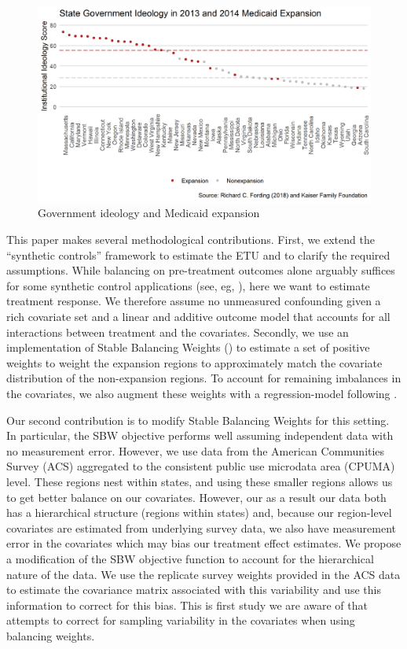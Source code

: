 \documentclass[12pt]{article}
\begin{document}
\begin{figure}
    \begin{center}
    \includegraphics[scale=0.7]{images/political-expansion-plot.png}
    \caption{Government ideology and Medicaid expansion}
    \label{fig1}
    \end{center}
\end{figure}

This paper makes several methodological contributions. First, we extend the ``synthetic controls'' framework to estimate the ETU and to clarify the required assumptions. While balancing on pre-treatment outcomes alone arguably suffices for some synthetic control applications (see, eg, \cite{botosaru2017role}), here we want to estimate treatment response. We therefore assume no unmeasured confounding given a rich covariate set and a linear and additive outcome model that accounts for all interactions between treatment and the covariates. Secondly, we use an implementation of Stable Balancing Weights (\cite{zubizarreta2015stable}) to estimate a set of positive weights to weight the expansion regions to approximately match the covariate distribution of the non-expansion regions. To account for remaining imbalances in the covariates, we also augment these weights with a regression-model following \cite{ben2018augmented}.

Our second contribution is to modify Stable Balancing Weights for this setting. In particular, the SBW objective performs well assuming independent data with no measurement error. However, we use data from the American Communities Survey (ACS) aggregated to the consistent public use microdata area (CPUMA) level. These regions nest within states, and using these smaller regions allows us to get better balance on our covariates. However, our as a result our data both has a hierarchical structure (regions within states) and, because our region-level covariates are estimated from underlying survey data, we also have measurement error in the covariates which may bias our treatment effect estimates. We propose a modification of the SBW objective function to account for the hierarchical nature of the data. We use the replicate survey weights provided in the ACS data to estimate the covariance matrix associated with this variability and use this information to correct for this bias. This is first study we are aware of that attempts to correct for sampling variability in the covariates when using balancing weights. 
\end{document}
